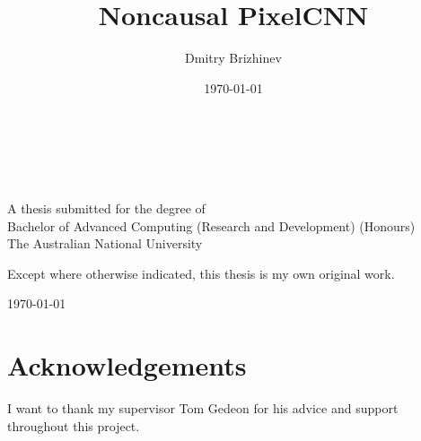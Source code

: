 \documentclass[11pt, a4paper, openany]{book}
\title{Noncausal PixelCNN}
\author{Dmitry Brizhinev}
\date{\today}
\begin{document}
\pagestyle{empty}
\thispagestyle{empty}

\begin{titlepage}
  \enlargethispage{2cm}
  \begin{center}
    \makeatletter
    \Huge\textbf{\@title} \\[.4cm]
    \Huge\textbf{\thesisqualifier} \\[2.5cm]
    \huge\textbf{\@author} \\[9cm]
    \makeatother
    \LARGE A thesis submitted for the degree of \\
    Bachelor of Advanced Computing (Research and Development) (Honours) \\
    The Australian National University \\[2cm]
    \thismonth
  \end{center}
\end{titlepage}


\vspace*{7cm}
\begin{center}
  Except where otherwise indicated, this thesis is my own original
  work.
\end{center}

\vspace*{4cm}

\hspace{8cm}\makeatletter\@author\makeatother\par
\hspace{8cm}\today

\cleardoublepage
\pagestyle{empty}
\chapter*{Acknowledgements}
I want to thank my supervisor Tom Gedeon for his advice and support throughout this project.
\end{document}
